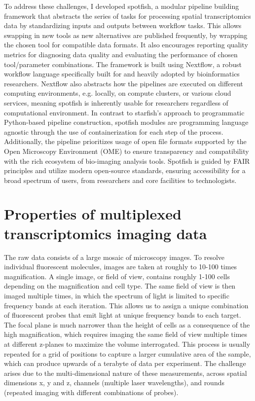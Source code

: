 To address these challenges, I developed spotfish, a modular pipeline building framework that abstracts the series of tasks for processing spatial transcriptomics data by standardizing inputs and outputs between workflow tasks. This allows swapping in new tools as new alternatives are published frequently, by wrapping the chosen tool for compatible data formats. It also encourages reporting quality metrics for diagnosing data quality and evaluating the performance of chosen tool/parameter combinations. The framework is built using Nextflow, a robust workflow language specifically built for and heavily adopted by bioinformatics researchers\cite{ditommasoNextflowEnablesReproducible2017}. Nextflow also abstracts how the pipelines are executed on different computing environments, e.g. locally, on compute clusters, or various cloud services, meaning spotfish is inherently usable for researchers regardless of computational environment. In contrast to starfish's approach to programmatic Python-based pipeline construction, spotfish modules are programming language agnostic through the use of containerization for each step of the process. Additionally, the pipeline prioritizes usage of open file formats supported by the Open Microscopy Environment\cite{goldbergOpenMicroscopyEnvironment2005} (OME) to ensure transparency and compatibility with the rich ecosystem of bio-imaging analysis tools. Spotfish is guided by FAIR principles\cite{wilkinsonFAIRGuidingPrinciples2016} and utilize modern open-source standards, ensuring accessibility for a broad spectrum of users, from researchers and core facilities to technologists.

\section{Properties of multiplexed transcriptomics imaging data}

The raw data consists of a large mosaic of microscopy images. To resolve individual fluorescent molecules, images are taken at roughly to 10-100 times magnification. A single image, or field of view, contains roughly 1-100 cells depending on the magnification and cell type. The same field of view is then imaged multiple times, in which the spectrum of light is limited to specific frequency bands at each iteration. This allows us to assign a unique combination of fluorescent probes that emit light at unique frequency bands to each target. The focal plane is much narrower than the height of cells as a consequence of the high magnification, which requires imaging the same field of view multiple times at different z-planes to maximize the volume interrogated. This process is usually repeated for a grid of positions to capture a larger cumulative area of the sample, which can produce upwards of a terabyte of data per experiment. The challenge arises due to the multi-dimensional nature of these measurements, across spatial dimensions x, y and z, channels (multiple laser wavelengths), and rounds (repeated imaging with different combinations of probes).

